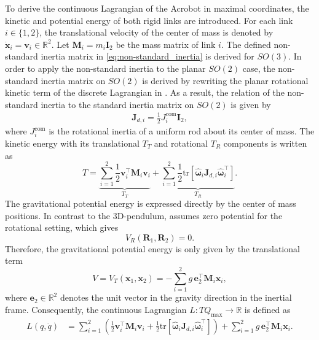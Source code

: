 To derive the continuous Lagrangian of the Acrobot in maximal coordinates, the
kinetic and potential energy of both rigid links are introduced. For each link
\(i\in\{1,2\}\), the translational velocity of the center of mass is denoted by
\(\dot{\bm{x}}_i=\bm{v}_i\in\mathbb{R}^2\). Let $\bm{M}_i = m_i\bm{I}_2$ be the mass matrix of link \(i\).
The defined non-standard inertia matrix in \eqref{eq:non-standard_inertia}
is derived for $SO(3)$. In order to apply the non-standard inertia to the planar $SO(2)$ case,
the non-standard inertia matrix on \(SO(2)\) is derived by rewriting the 
planar rotational kinetic term of the discrete Lagrangian in
\cite{LeeLeokMcClamroch2007DiscreteControlSystems}. 
As a result, the relation of the non-standard
inertia to the standard inertia matrix on $SO(2)$ is given by
\begin{align}\label{eq:2D_nonstandard_inertia}
    \bm{J}_{d,i}
    =
    \frac{1}{2}J_i^{\mathrm{com}} \bm{I}_2,
\end{align}
where $J_i^{\mathrm{com}}$ is the rotational inertia of a uniform rod about its center of mass. 
The kinetic energy with its translational $T_T$ and rotational $T_R$ components is written as
\begin{equation}
    T
    =
    \underbrace{
    \sum_{i=1}^{2}
    \frac{1}{2}\bm{v}_i^{\top}\bm{M}_i\bm{v}_i
    }_{T_T}
    +
    \underbrace{
    \sum_{i=1}^{2}
    \frac{1}{2}
    \mathrm{tr}
    \left[
        \bm{\widehat{\omega}}_i
        \bm{J}_{d,i}
        \bm{\widehat{\omega}}_i^{\top}
    \right]
    }_{T_R}.
    \label{eq:acrobot_kinetic_energy_split}
\end{equation}
The gravitational potential energy is expressed directly by the center of mass
positions. In contrast to the 3D-pendulum, \cite{BrudigamManchester2021VariationalIntegrators} assumes zero potential for the rotational setting, 
which gives 
\begin{equation}
    V_R(\bm{R}_1,\bm{R}_2)=0.
    \label{eq:acrobot_rotation_potential_zero}
\end{equation}
Therefore, the gravitational potential energy is only given by the translational term
\begin{equation}
    V = V_T(\bm{x}_1,\bm{x}_2)
    =
    -
    \sum_{i=1}^{2}
    g\,\bm{e}_2^{\top}\bm{M}_i\bm{x}_i,
    \label{eq:acrobot_potential_energy}
\end{equation}
where \(\bm{e}_2\in\mathbb{R}^2\) denotes the unit vector in the gravity direction in the inertial frame.
Consequently, the continuous Lagrangian
\(L:TQ_{\mathrm{max}}\rightarrow\mathbb{R}\) is defined as
\begin{equation}
    \begin{aligned}
    L(q,\dot{q})
    &=
    \sum_{i=1}^{2}
    \left(
    \frac{1}{2}\bm{v}_i^{\top}\bm{M}_i\bm{v}_i
    +
    \frac{1}{2}
    \mathrm{tr}
    \left[
        \bm{\widehat{\omega}}_i
        \bm{J}_{d,i}
        \bm{\widehat{\omega}}_i^{\top}
    \right]
    \right)
    +
    \sum_{i=1}^{2}
    g\,\bm{e}_2^{\top}\bm{M}_i\bm{x}_i .
    \end{aligned}
    \label{eq:acrobot_continuous_lagrangian}
\end{equation}


